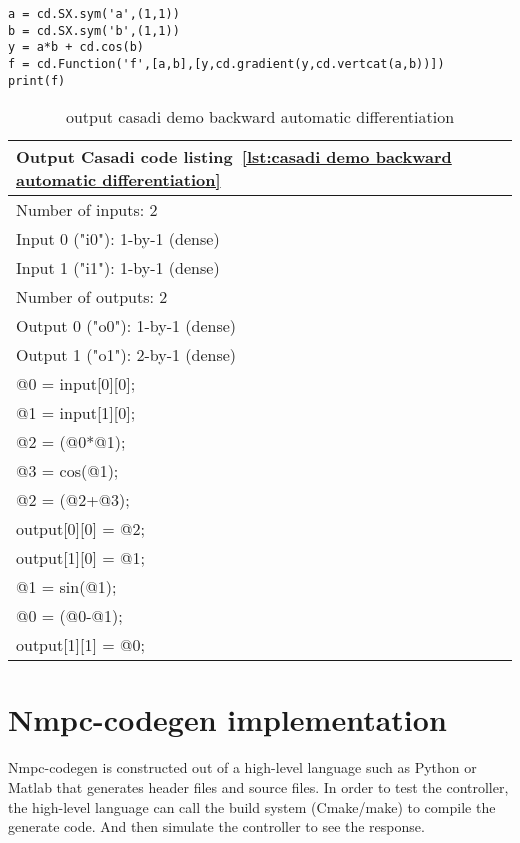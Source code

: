 \begin{lstlisting}[caption={Casadi code example automatic backward differentiation},label={lst:casadi demo backward automatic differentiation}]
a = cd.SX.sym('a',(1,1))
b = cd.SX.sym('b',(1,1))
y = a*b + cd.cos(b)
f = cd.Function('f',[a,b],[y,cd.gradient(y,cd.vertcat(a,b))])
print(f)
\end{lstlisting}


\begin{table}
	\begin{center}
		\begin{tabular}{ |l|  }
			\hline
			Output Casadi code listing~\ref{lst:casadi demo backward automatic differentiation} \\
			\hline
			Number of inputs: 2 \\
			Input 0 ("i0"): 1-by-1 (dense) \\
			Input 1 ("i1"): 1-by-1 (dense) \\
			Number of outputs: 2 \\
			Output 0 ("o0"): 1-by-1 (dense) \\
			Output 1 ("o1"): 2-by-1 (dense) \\
			@0 = input[0][0]; \\
			@1 = input[1][0]; \\
			@2 = (@0*@1); \\
			@3 = cos(@1); \\
			@2 = (@2+@3); \\
			output[0][0] = @2; \\
			output[1][0] = @1; \\
			@1 = sin(@1); \\
			@0 = (@0-@1); \\
			output[1][1] = @0; \\
			\hline   
		\end{tabular}
		\caption{output casadi demo backward automatic differentiation}
		\label{tbl:output casadi demo backward automatic differentiation}
	\end{center}
\end{table}


\section{Nmpc-codegen implementation}
Nmpc-codegen is constructed out of a high-level language such as Python or Matlab that generates header files and source files. In order to test the controller, the high-level language can call the build system (Cmake/make) to compile the generate code. And then simulate the controller to see the response.

